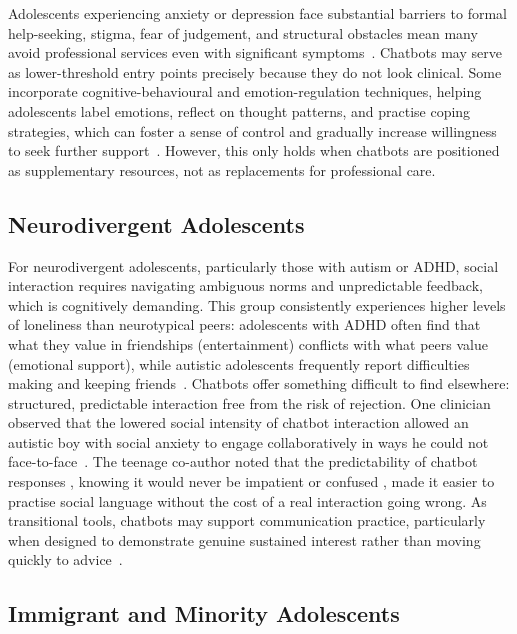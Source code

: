 \documentclass[manuscript]{acmart}
\begin{document}
Adolescents experiencing anxiety or depression face substantial barriers to formal
help-seeking, stigma, fear of judgement, and structural obstacles mean many avoid
professional services even with significant symptoms~\cite{kuhlmeier2025designing}. Chatbots
may serve as lower-threshold entry points precisely because they do not look clinical. Some
incorporate cognitive-behavioural and emotion-regulation techniques, helping adolescents
label emotions, reflect on thought patterns, and practise coping strategies, which can
foster a sense of control and gradually increase willingness to seek further
support~\cite{kuhlmeier2025designing}. However, this only holds when chatbots are positioned
as supplementary resources, not as replacements for professional care.

\subsection{Neurodivergent Adolescents}

For neurodivergent adolescents, particularly those with autism or ADHD, social
interaction requires navigating ambiguous norms and unpredictable feedback, which is
cognitively demanding. This group consistently experiences higher levels of loneliness than
neurotypical peers: adolescents with ADHD often find that what they value in friendships
(entertainment) conflicts with what peers value (emotional support), while autistic
adolescents frequently report difficulties making and keeping friends~\cite{verity2025loneliness}.
Chatbots offer something difficult to find elsewhere: structured, predictable interaction free
from the risk of rejection. One clinician observed that the lowered social intensity of chatbot
interaction allowed an autistic boy with social anxiety to engage collaboratively in ways he
could not face-to-face~\cite{hipgrave2025balancing}. The teenage co-author noted that the
predictability of chatbot responses , knowing it would never be impatient or confused ,
made it easier to practise social language without the cost of a real interaction going wrong.
As transitional tools, chatbots may support communication practice, particularly when designed
to demonstrate genuine sustained interest rather than moving quickly to
advice~\cite{LisboaWhite2024}.

\subsection{Immigrant and Minority Adolescents}
\end{document}
